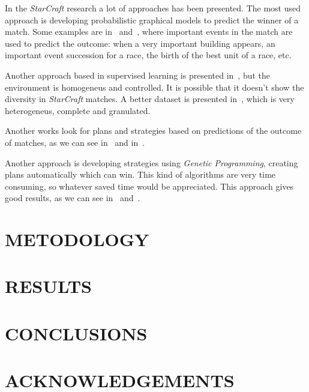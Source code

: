\documentclass[a4paper,twoside]{article}
\begin{document}
\noindent In the \emph{StarCraft} research a lot of approaches has been presented.
The most used approach is developing probabilistic graphical models to predict
the winner of a match. Some examples are in~\cite{DBLP:conf/cig/SynnaeveB11a}
and~\cite{DBLP:conf/aiide/StanescuHEGB13}, where important events in the match
are used to predict the outcome: when a very important building appears,
an important event succession for a race, the birth of the best unit of a race,
etc.

Another approach based in supervised learning is presented
in~\cite{DBLP:conf/cosecivi/Sanchez-Ruiz15}, but the environment is homogeneus
and controlled. It is possible that it doesn't show the diversity in
\emph{StarCraft} matches. A better dataset is presented
in~\cite{DBLP:conf/flairs/RobertsonW14}, which is very heterogeneus,
complete and granulated.

Another works look for plans and strategies based on predictions of the outcome
of matches, as we can see in~\cite{adaptativeStrategyPrediction} and
in~\cite{makingAndActing}.

Another approach is developing strategies using \emph{Genetic Programming},
creating plans automatically which can win. This kind of algorithms are very
time consuming, so whatever saved time would be appreciated. This approach
gives good results, as we can see in~\cite{DBLP:conf/evoW/Fernandez-AresG16}
and~\cite{DBLP:conf/cig/Garcia-SanchezT15}.

\section{\uppercase{Metodology}}
\label{sec:metodology}

\section{\uppercase{Results}}
\label{sec:results}

\section{\uppercase{Conclusions}}
\label{sec:conclusions}

\section*{\uppercase{Acknowledgements}}
\label{sec:acknowledgements}

\vfill

{\small
}

\vfill
\end{document}
